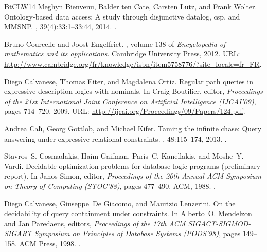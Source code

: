 \documentclass[10pt,a4paper]{amsart}
\theoremstyle{definition}
\numberwithin{equation}{section}
\theoremstyle{plain}
\theoremstyle{definition}
\theoremstyle{myexample}
\theoremstyle{plain}
\theoremstyle{definition}
\begin{document}
\begin{thebibliography}{BtCLW14}
Meghyn Bienvenu, Balder ten Cate, Carsten Lutz, and Frank Wolter.
\newblock Ontology-based data access: {A} study through disjunctive datalog,
  csp, and {MMSNP}.
, 39(4):33:1--33:44,
  2014.
\newblock \href {https://doi.org/10.1145/2661643} {}.

Bruno Courcelle and Joost Engelfriet.
, volume 138 of {\em Encyclopedia of mathematics
  and its applications}.
\newblock Cambridge University Press, 2012.
\newblock URL:
  \url{http://www.cambridge.org/fr/knowledge/isbn/item5758776/?site_locale=fr_FR}.

Diego Calvanese, Thomas Eiter, and Magdalena Ortiz.
\newblock Regular path queries in expressive description logics with nominals.
\newblock In Craig Boutilier, editor, {\em Proceedings of the 21st
  International Joint Conference on Artificial Intelligence ({IJCAI}'09)},
  pages 714--720, 2009.
\newblock URL: \url{http://ijcai.org/Proceedings/09/Papers/124.pdf}.

Andrea Cal{\`{\i}}, Georg Gottlob, and Michael Kifer.
\newblock Taming the infinite chase: Query answering under expressive
  relational constraints.
, 48:115--174, 2013.
\newblock \href {https://doi.org/10.1613/jair.3873}
  {}.

Stavros~S. Cosmadakis, Haim Gaifman, Paris~C. Kanellakis, and Moshe~Y. Vardi.
\newblock Decidable optimization problems for database logic programs
  (preliminary report).
\newblock In Janos Simon, editor, {\em Proceedings of the 20th Annual {ACM}
  Symposium on Theory of Computing (STOC'88)}, pages 477--490. {ACM}, 1988.
\newblock \href {https://doi.org/10.1145/62212.62259}
  {}.

Diego Calvanese, Giuseppe~De Giacomo, and Maurizio Lenzerini.
\newblock On the decidability of query containment under constraints.
\newblock In Alberto~O. Mendelzon and Jan Paredaens, editors, {\em Proceedings
  of the 17th {ACM} {SIGACT-SIGMOD-SIGART} Symposium on Principles of Database
  Systems (PODS'98)}, pages 149--158. {ACM} Press, 1998.
\newblock \href {https://doi.org/10.1145/275487.275504}
  {}.


\end{thebibliography}
\end{document}
